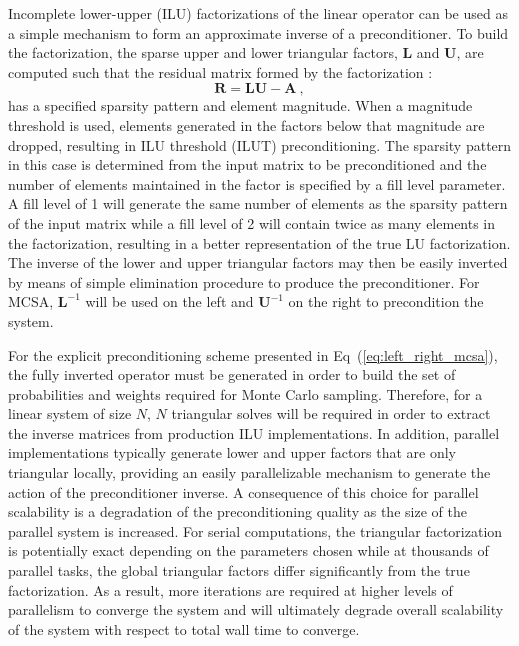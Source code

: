 Incomplete lower-upper (ILU) factorizations of the linear operator can
be used as a simple mechanism to form an approximate inverse of a
preconditioner. To build the factorization, the sparse upper and lower
triangular factors, $\mathbf{L}$ and $\mathbf{U}$, are computed such
that the residual matrix formed by the factorization
\cite{saad_iterative_2003}:
\begin{equation}
  \mathbf{R} = \mathbf{L} \mathbf{U} - \mathbf{A} \:,
  \label{eq:ilu_residual_matrix}
\end{equation}
has a specified sparsity pattern and element magnitude. When a
magnitude threshold is used, elements generated in the factors below
that magnitude are dropped, resulting in ILU threshold (ILUT)
preconditioning. The sparsity pattern in this case is determined from
the input matrix to be preconditioned and the number of elements
maintained in the factor is specified by a fill level parameter. A
fill level of 1 will generate the same number of elements as the
sparsity pattern of the input matrix while a fill level of 2 will
contain twice as many elements in the factorization, resulting in a
better representation of the true LU factorization. The inverse of the
lower and upper triangular factors may then be easily inverted by
means of simple elimination procedure to produce the
preconditioner. For MCSA, $\mathbf{L}^{-1}$ will be used on the left
and $\mathbf{U}^{-1}$ on the right to precondition the system.

For the explicit preconditioning scheme presented in
Eq~(\ref{eq:left_right_mcsa}), the fully inverted operator must be
generated in order to build the set of probabilities and weights
required for Monte Carlo sampling. Therefore, for a linear system of
size $N$, $N$ triangular solves will be required in order to extract
the inverse matrices from production ILU implementations. In addition,
parallel implementations typically generate lower and upper factors
that are only triangular locally, providing an easily parallelizable
mechanism to generate the action of the preconditioner inverse. A
consequence of this choice for parallel scalability is a degradation
of the preconditioning quality as the size of the parallel system is
increased. For serial computations, the triangular factorization is
potentially exact depending on the parameters chosen while at
thousands of parallel tasks, the global triangular factors differ
significantly from the true factorization. As a result, more
iterations are required at higher levels of parallelism to converge
the system and will ultimately degrade overall scalability of the
system with respect to total wall time to converge.

